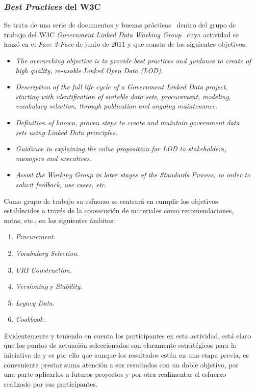 \subsubsection{\textit{Best Practices} del W3C}
Se trata de una serie de documentos y buenas prácticas~\cite{best-gld} dentro del 
grupo de trabajo del \gls{W3C} \textit{Government Linked Data Working Group}~\cite{gld-group} cuya actividad se lanzó
 en el \textit{Face 2 Face} de junio de 2011 y que consta de los siguientes objetivos:

\begin{itemize}
 \item \textit{The overarching objective is to provide best practices and guidance to create of high quality, re-usable Linked Open Data (LOD)}.
 \item \textit{Description of the full life cycle of a Government Linked Data project, starting with identification of suitable data sets, procurement, modeling, vocabulary selection, through publication and ongoing maintenance.}
 \item \textit{Definition of known, proven steps to create and maintain government data sets using Linked Data principles.}
  \item \textit{Guidance in explaining the value proposition for LOD to stakeholders, managers and executives.}
  \item \textit{Assist the Working Group in later stages of the Standards Process, in order to solicit feedback, use cases, etc.}
\end{itemize}

Como grupo de trabajo su esfuerzo se centrará en cumplir los objetivos establecidos a través de la consecución de materiales como 
recomendaciones, notas, etc., en los siguientes ámbitos:
\begin{enumerate}
 \item  \textit{Procurement}.
 \item  \textit{Vocabulary Selection}.
 \item \textit{URI Construction}.
   \item \textit{Versioning} y \textit{Stability}.
   \item \textit{Legacy Data}.
   \item \textit{Cookbook}. 
\end{enumerate}

Evidentemente y teniendo en cuenta los participantes en esta actividad, está claro que los puntos de actuación
seleccionados son claramente estratégicos para la iniciativa de \linkeddata y es por ello que aunque
los resultados están en una etapa previa, es conveniente prestar suma atención a sus resultados con un doble objetivo, 
por una parte aplicarlos a futuros proyectos y por otra realimentar el esfuerzo realizado por sus participantes.

